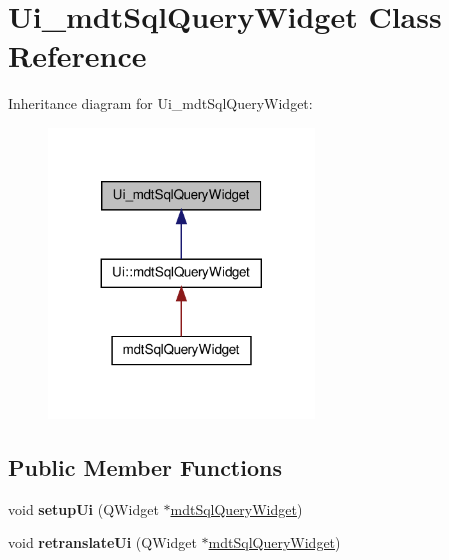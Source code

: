 \hypertarget{class_ui__mdt_sql_query_widget}{
\section{Ui\_\-mdtSqlQueryWidget Class Reference}
\label{class_ui__mdt_sql_query_widget}
}


Inheritance diagram for Ui\_\-mdtSqlQueryWidget:\nopagebreak
\begin{figure}[H]
\begin{center}
\leavevmode
\includegraphics[width=200pt]{class_ui__mdt_sql_query_widget__inherit__graph}
\end{center}
\end{figure}
\subsection*{Public Member Functions}
\begin{DoxyCompactItemize}
\item 
\hypertarget{class_ui__mdt_sql_query_widget_a9ae4657102919bba47ca1bab699a4ee3}{
void {\bfseries setupUi} (QWidget $\ast$\hyperlink{classmdt_sql_query_widget}{mdtSqlQueryWidget})}
\label{class_ui__mdt_sql_query_widget_a9ae4657102919bba47ca1bab699a4ee3}

\item 
\hypertarget{class_ui__mdt_sql_query_widget_af8270a7f65d1d4a615d36681655bfb7e}{
void {\bfseries retranslateUi} (QWidget $\ast$\hyperlink{classmdt_sql_query_widget}{mdtSqlQueryWidget})}
\label{class_ui__mdt_sql_query_widget_af8270a7f65d1d4a615d36681655bfb7e}

\end{DoxyCompactItemize}
